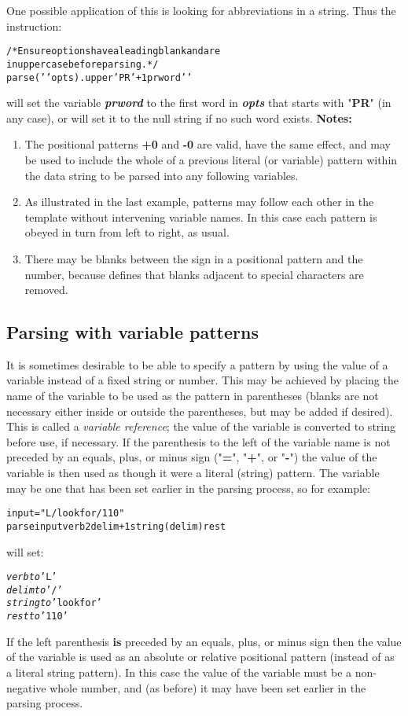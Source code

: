  One possible application of this is looking for abbreviations in a
string. Thus the instruction:
\begin{alltt}
/* Ensure options have a leading blank and are
   in uppercase before parsing. */
parse (' 'opts).upper ' PR' +1 prword ' '
\end{alltt}
will set the variable \textbf{\emph{prword}} to the first word
in \textbf{\emph{opts}} that starts with "\textbf{PR}" (in
any case), or will set it to the null string if no such word exists.
 \textbf{Notes:}
\begin{enumerate}
\item The positional patterns \textbf{+0} and \textbf{-0} are valid,
have the same effect, and may be used to include the whole of a previous
literal (or variable) pattern within the data string to be parsed into
any following variables.
\item As illustrated in the last example, patterns may follow each other
in the template without intervening variable names.  In this case each
pattern is obeyed in turn from left to right, as usual.
\item There may be blanks between the sign in a positional pattern and
the number, because \nr{} defines that blanks adjacent to special
characters are removed.
\end{enumerate}
\subsection{Parsing with variable patterns}
 It is sometimes desirable to be able to specify a pattern by using
the value of a variable instead of a fixed string or number.
This may be achieved by placing the name of the variable to be used as
the pattern in parentheses (blanks are not necessary either inside or
outside the parentheses, but may be added if desired).
This is called a \emph{variable reference}; the value of the variable
is converted to string before use, if necessary.
 If the parenthesis to the left of the variable name is not preceded
by an equals, plus, or minus sign ("\textbf{=}",
"\textbf{+}", or "\textbf{-}")
the value of the variable is then used as though it were a literal
(string) pattern.
The variable may be one that has been set earlier in the parsing
process, so for example:
\begin{alltt}
input="L/look for/1 10"
parse input  verb 2 delim +1 string (delim) rest
\end{alltt}
will set:
\begin{alltt}
\emph{verb} \emph{to} 'L'
\emph{delim} \emph{to} '/'
\emph{string} \emph{to} 'look for'
\emph{rest} \emph{to} '1 10'
\end{alltt}
 If the left parenthesis \textbf{is} preceded by an equals, plus,
or minus sign then the value of the variable is used as an absolute or
relative positional pattern (instead of as a literal string pattern).
In this case the value of the variable must be a non-negative
whole number, and (as before) it may have been set earlier in the
parsing process.
\index{,}
\index{,}
\index{,}
\index{,}
